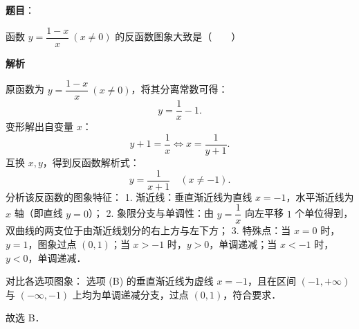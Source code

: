 \begin{answer}

\textbf{题目}：

函数 $y = \dfrac{1-x}{x}\ (x \neq 0)$ 的反函数图象大致是\mbox{（　　）}
\nopagebreak[4]
\begin{center}\end{center}
\nopagebreak[4]
\textbf{解析}

原函数为 $y = \dfrac{1-x}{x}\ (x \neq 0)$，将其分离常数可得：
\nopagebreak[4]
\[
y = \dfrac{1}{x} - 1.
\]
变形解出自变量 $x$：
\nopagebreak[4]
\[
y + 1 = \dfrac{1}{x} \iff x = \dfrac{1}{y + 1}.
\]
互换 $x, y$，得到反函数解析式：
\nopagebreak[4]
\[
y = \dfrac{1}{x + 1} \quad (x \neq -1).
\]
分析该反函数的图象特征：
1. 渐近线：垂直渐近线为直线 $x = -1$，水平渐近线为 $x$ 轴（即直线 $y = 0$）；
2. 象限分支与单调性：由 $y = \dfrac{1}{x}$ 向左平移 $1$ 个单位得到，双曲线的两支位于由渐近线划分的右上方与左下方；
3. 特殊点：当 $x = 0$ 时，$y = 1$，图象过点 $(0, 1)$；当 $x > -1$ 时，$y > 0$，单调递减；当 $x < -1$ 时，$y < 0$，单调递减．

对比各选项图象：
选项 (B) 的垂直渐近线为虚线 $x = -1$，且在区间 $(-1, +\infty)$ 与 $(-\infty, -1)$ 上均为单调递减分支，过点 $(0, 1)$，符合要求．

故选 B．


\end{answer}
